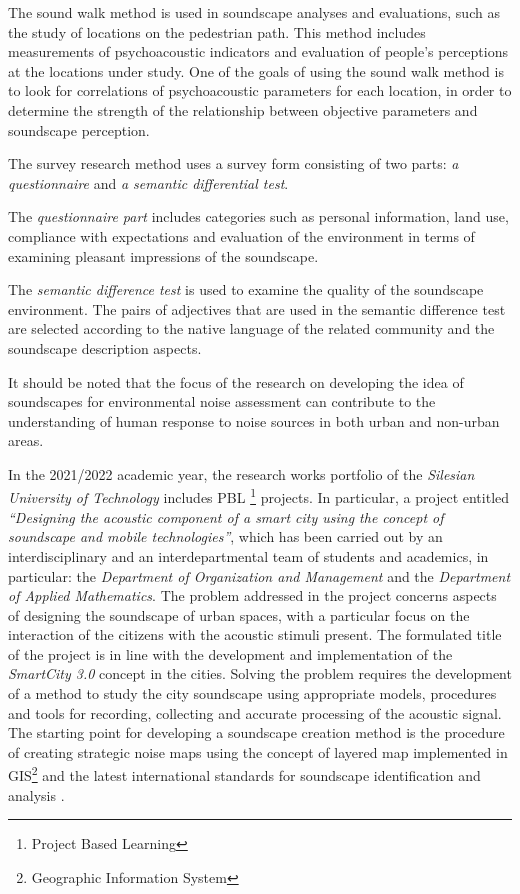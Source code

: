\documentclass[a4paper,10pt]{article}
\begin{document}
\begin{multicols}{2}
The sound walk method is used in soundscape analyses and evaluations, such as
the study of locations on the pedestrian path. This method includes measurements
of psychoacoustic indicators and evaluation of people's perceptions at the
locations under study. One of the goals of using the sound walk method is to
look for correlations of psychoacoustic parameters for each location, in order
to determine the strength of the relationship between objective parameters and
soundscape perception.

The survey research method uses a survey form consisting of two parts: \emph{a
questionnaire} and \emph{a semantic differential test}. 

The \emph{questionnaire part} includes categories such as personal information,
land use, compliance with expectations and evaluation of the environment in
terms of examining pleasant impressions of the soundscape.

The \emph{semantic difference test} is used to examine the quality of the
soundscape environment. The pairs of adjectives that are used in the semantic
difference test are selected according to the native language of the related
community and the soundscape description aspects.

It should be noted that the focus of the research on developing the idea of
soundscapes for environmental noise assessment can contribute to the
understanding of human response to noise sources in both urban and non-urban
areas.

In the 2021/2022 academic year, the research works portfolio of the
\emph{Silesian University of Technology} includes PBL \footnote{Project
Based Learning} projects. In particular, a project entitled \emph{``Designing
the acoustic component of a smart city using the concept of soundscape and
mobile technologies''}, which has been carried out by an interdisciplinary and
an interdepartmental team of students and academics, in particular: the
\emph{Department of Organization and Management} and the \emph{Department of
Applied Mathematics}. The problem addressed in the project concerns aspects of
designing the soundscape of urban spaces, with a particular focus on the
interaction of the citizens with the acoustic stimuli present. The formulated
title of the project is in line with the development and implementation of the
\emph{SmartCity 3.0} concept in the cities. Solving the problem requires the
development of a method to study the city soundscape using appropriate models,
procedures and tools for recording, collecting and accurate processing of the
acoustic signal. The starting point for developing a soundscape creation method
is the procedure of creating strategic noise maps using the concept of layered
map implemented in GIS\footnote{Geographic Information System} and the latest
international standards for soundscape identification and analysis
\cite{ISO:12913-1, ISO:12913-2, ISO:12913-3}.


\end{multicols}
\end{document}
